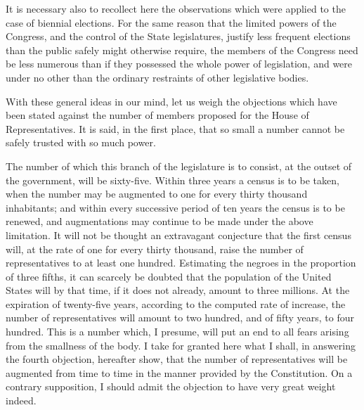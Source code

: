 It is necessary also to recollect here the observations which were applied to the case of biennial elections. 
For the same reason that the limited powers of the Congress, and the control of the State legislatures, justify less frequent elections than the public safely might otherwise require, the members of the Congress need be less numerous than if they possessed the whole power of legislation, and were under no other than the ordinary restraints of other legislative bodies.

With these general ideas in our mind, let us weigh the objections which have been stated against the number of members proposed for the House of Representatives. 
It is said, in the first place, that so small a number cannot be safely trusted with so much power.

The number of which this branch of the legislature is to consist, at the outset of the government, will be sixty-five. 
Within three years a census is to be taken, when the number may be augmented to one for every thirty thousand inhabitants; and within every successive period of ten years the census is to be renewed, and augmentations may continue to be made under the above limitation. 
It will not be thought an extravagant conjecture that the first census will, at the rate of one for every thirty thousand, raise the number of representatives to at least one hundred. 
Estimating the negroes in the proportion of three fifths, it can scarcely be doubted that the population of the United States will by that time, if it does not already, amount to three millions. 
At the expiration of twenty-five years, according to the computed rate of increase, the number of representatives will amount to two hundred, and of fifty years, to four hundred. 
This is a number which, I presume, will put an end to all fears arising from the smallness of the body. 
I take for granted here what I shall, in answering the fourth objection, hereafter show, that the number of representatives will be augmented from time to time in the manner provided by the Constitution. 
On a contrary supposition, I should admit the objection to have very great weight indeed.

